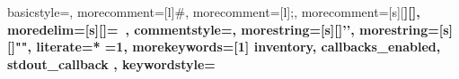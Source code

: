 
{
  basicstyle=\ttfamily\footnotesize,
  morecomment=[l]{\#},
  morecomment=[l]{;},
  morecomment=[s][\color{darkblue}\bfseries]{[}{]},
  moredelim=[s][\color{darkbrown}]{=}{\ },
  commentstyle=\color{darkgreen},
  morestring=[s][\color{maroon}]{'}{'},
  morestring=[s][\color{maroon}]{"}{"},
  literate=*%
    {=}{{{\color{red}{=}}}}{1},%
  morekeywords=[1]{
    inventory,
    callbacks_enabled,
    stdout_callback
  },
  keywordstyle=\color{mediumgreen}
}
